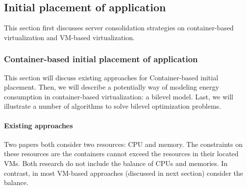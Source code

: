 


\subsection{Initial placement of application}
\label{sec:initial}

This section first discusses server consolidation strategies on container-based virtualization and VM-based virtualization.




\subsubsection{Container-based initial placement of application}
\label{container-based-placement}
This section will discuss existing approaches for Container-based initial placement. Then, we will describe a potentially way of modeling energy consumption in container-based virtualization: a bilevel model. Last, we will illustrate a number of algorithms to solve bilevel optimization problems. 


\paragraph{Existing approaches}

 Two papers both consider two resources: CPU and memory. The constraints on these resources are the containers cannot exceed the resources in their located VMs. Both research do not include the balance of CPUs and memories. In contrast, in most VM-based approaches (discussed in next section) consider the balance.

